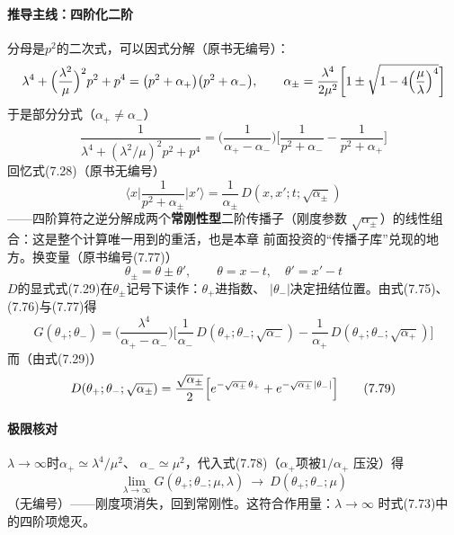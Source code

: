 \paragraph{推导主线：四阶化二阶}
分母是$p^{2}$的二次式，可以因式分解（原书无编号）：
\begin{equation*}
\lambda^{4}+\Bigl(\frac{\lambda^{2}}{\mu}\Bigr)^{2}p^{2}+p^{4}
=\bigl(p^{2}+\alpha_{+}\bigr)\bigl(p^{2}+\alpha_{-}\bigr),
\qquad
\alpha_{\pm}=\frac{\lambda^{4}}{2\mu^{2}}\biggl[1\pm\sqrt{
1-4\Bigl(\frac{\mu}{\lambda}\Bigr)^{4}}\biggr]
\end{equation*}
于是部分分式（$\alpha_{+}\neq\alpha_{-}$）
\begin{equation*}
\frac{1}{\lambda^{4}+(\lambda^{2}/\mu)^{2}p^{2}+p^{4}}
=\biggl(\frac{1}{\alpha_{+}-\alpha_{-}}\biggr)
\biggl[\frac{1}{p^{2}+\alpha_{-}}-\frac{1}{p^{2}+\alpha_{+}}\biggr]
\tag{7.76}
\end{equation*}
回忆式(7.28)（原书无编号）
\begin{equation*}
\biggl\langle x\biggl|\frac{1}{p^{2}+\alpha_{\pm}}\biggr|x'\biggr\rangle
=\frac{1}{\alpha_{\pm}}\,D(x,x';t;\sqrt{\alpha_{\pm}})
\end{equation*}
——四阶算符之逆分解成两个\textbf{常刚性型}二阶传播子（刚度参数
$\sqrt{\alpha_{\pm}}$）的线性组合：这是整个计算唯一用到的重活，也是本章
前面投资的“传播子库”兑现的地方。换变量（原书编号(7.77)）
\begin{equation*}
\theta_{\pm}=\theta\pm\theta',\qquad
\theta=x-t,\quad\theta'=x'-t
\tag{7.77}
\end{equation*}
$D$的显式式(7.29)在$\theta_{\pm}$记号下读作：$\theta_{+}$进指数、
$|\theta_{-}|$决定扭结位置。由式(7.75)、(7.76)与(7.77)得
\begin{equation*}
G(\theta_{+};\theta_{-})=\biggl(\frac{\lambda^{4}}{\alpha_{+}-\alpha_{-}}
\biggr)\biggl[\frac{1}{\alpha_{-}}\,D(\theta_{+};\theta_{-};\sqrt{\alpha_{-}})
-\frac{1}{\alpha_{+}}\,D(\theta_{+};\theta_{-};\sqrt{\alpha_{+}})\biggr]
\tag{7.78}
\end{equation*}
而（由式(7.29)）
\begin{equation*}
D(\theta_{+};\theta_{-};\sqrt{\alpha_{\pm}})=\frac{\sqrt{\alpha_{\pm}}}{2}
\Bigl[e^{-\sqrt{\alpha_{\pm}}\,\theta_{+}}+e^{-\sqrt{\alpha_{\pm}}\,
|\theta_{-}|}\Bigr]
\tag{7.79}
\end{equation*}

\paragraph{极限核对}
$\lambda\to\infty$时$\alpha_{+}\simeq\lambda^{4}/\mu^{2}$、
$\alpha_{-}\simeq\mu^{2}$，代入式(7.78)（$\alpha_{+}$项被$1/\alpha_{+}$
压没）得
\begin{equation*}
\lim_{\lambda\to\infty}G(\theta_{+};\theta_{-};\mu,\lambda)\ \longrightarrow\
D(\theta_{+};\theta_{-};\mu)
\end{equation*}
（无编号）——刚度项消失，回到常刚性。这符合作用量：$\lambda\to\infty$
时式(7.73)中的四阶项熄灭。

